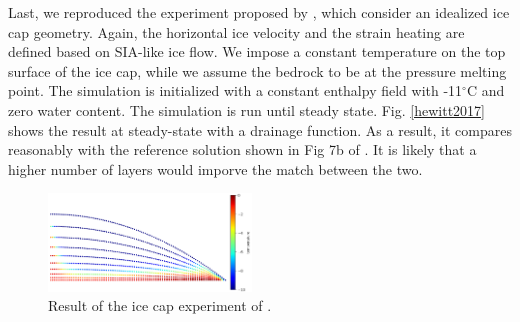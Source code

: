 \documentclass[gmd]{copernicus}
\begin{document}
Last, we reproduced the experiment proposed by \citet{hewitt2017models},
which consider an idealized ice cap geometry. Again, the horizontal ice velocity 
and the strain heating are defined based on SIA-like ice flow. We impose 
a constant temperature on the top surface of the ice cap, while we assume 
the bedrock to be at the pressure melting point. The simulation is initialized 
with a constant enthalpy field  with -11$^{\circ}$C and zero water content.
The simulation is run until steady state.
Fig. \eqref{hewitt2017} shows the result at steady-state with a drainage function.
As a result, it compares reasonably with the reference solution shown in Fig 7b 
of \citep{hewitt2017models}. It is likely that a higher number of layers would
imporve the match between the two.

\begin{figure}[!h]
\begin{center} 
\includegraphics[width=0.48\textwidth]{fig/hewitt2017.png}   
\end{center}
\caption{ Result of the ice cap experiment  of \citep{hewitt2017models}. \label{hewitt2017}}
\end{figure}








\end{document}
